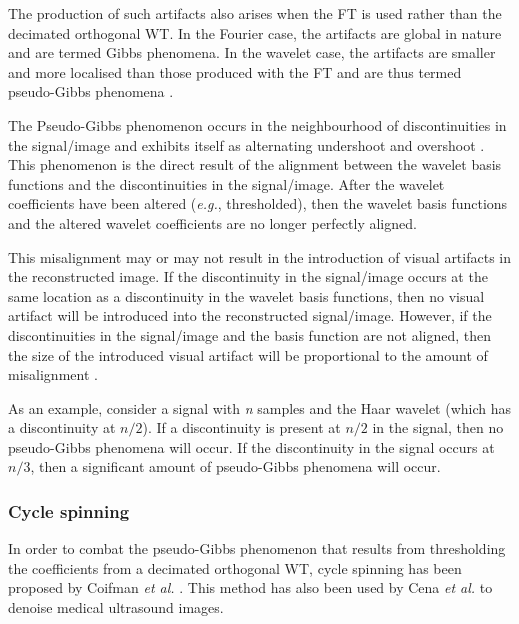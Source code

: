 \documentclass[12pt]{report}
\begin{document}
The production of such artifacts also arises when the FT is used rather than the decimated 
orthogonal WT. In the Fourier case, the artifacts are global in nature and are termed Gibbs phenomena.
In the wavelet case, the artifacts are smaller and more localised than those produced with the FT and are
thus termed pseudo-Gibbs phenomena \cite{durand}.

The Pseudo-Gibbs phenomenon occurs in the neighbourhood of discontinuities in the signal/image and exhibits itself as
alternating undershoot and overshoot \cite{coifman}.
This phenomenon is the direct result of the alignment between the wavelet basis functions and the discontinuities in the
signal/image.
After the wavelet coefficients have been altered (\emph{e.g.}, thresholded), then the wavelet basis functions and the 
altered wavelet coefficients are no longer perfectly aligned.

This misalignment may or may not result in the introduction of visual artifacts in the reconstructed image.
If the discontinuity in the signal/image occurs at the same location as a discontinuity in the wavelet basis
functions, then no visual artifact will be introduced into the reconstructed signal/image. However, if the discontinuities
in the signal/image and the basis function are not aligned, then the size of the introduced visual artifact 
will be proportional to the amount of misalignment \cite{coifman}. 

As an example, consider a signal with \emph{n}
samples and the Haar wavelet (which has a discontinuity at $n/2$). If a discontinuity is present at $n/2$ in the signal, then 
no pseudo-Gibbs phenomena will occur. If the discontinuity in the signal occurs at $n/3$, then a significant amount of
pseudo-Gibbs phenomena will occur.

\subsubsection{Cycle spinning}
In order to combat the pseudo-Gibbs phenomenon that results from thresholding the
coefficients from a decimated orthogonal WT, cycle spinning
has been proposed by Coifman \emph{et al.} \cite{coifman}. This method has also been used by Cena \emph{et al.}
\cite {cena} to denoise medical ultrasound images.
\end{document}
